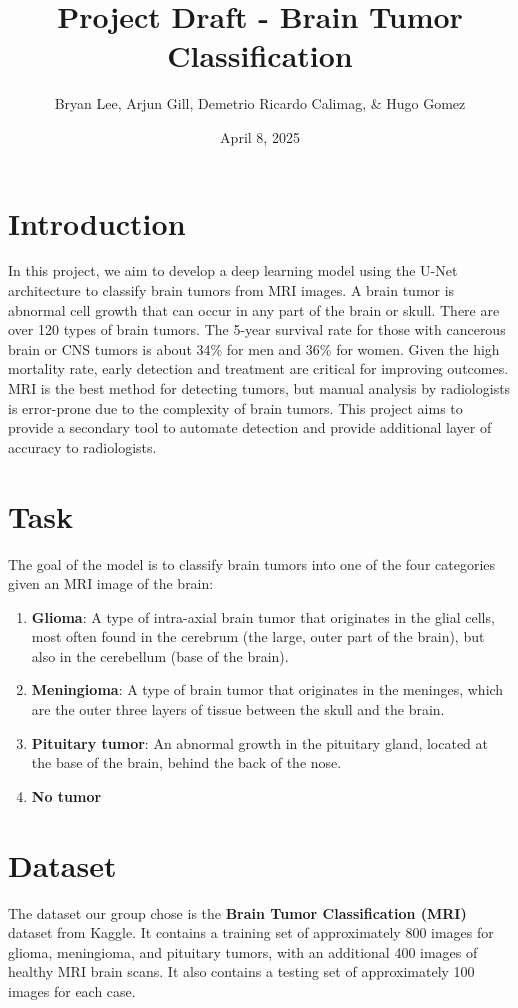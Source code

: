 \documentclass[11pt]{article}
\title{Project Draft - Brain Tumor Classification}
\author{Bryan Lee, Arjun Gill, Demetrio Ricardo Calimag, \& Hugo Gomez}
\date{April 8, 2025}
\begin{document}
\maketitle
\thispagestyle{fancy}

\section{Introduction}
In this project, we aim to develop a deep learning model using the U-Net architecture to classify 
brain tumors from MRI images. A brain tumor is abnormal cell growth that can occur in any 
part of the brain or skull. There are over 120 types of brain tumors. The 5-year survival 
rate for those with cancerous brain or CNS tumors is about 34\% for men and 36\% for women. 
Given the high mortality rate, early detection and treatment are critical for improving outcomes.  
MRI is the best method for detecting tumors, but manual analysis by radiologists is error-prone due to 
the complexity of brain tumors. This project aims to provide a secondary tool to automate detection
and provide additional layer of accuracy to radiologists.

\section{Task}
The goal of the model is to classify brain tumors into one of the four categories given an MRI image of the brain:
\begin{enumerate}
    \item \textbf{Glioma}: A type of intra-axial brain tumor that originates in the glial cells, most often found in the cerebrum 
    (the large, outer part of the brain), but also in the cerebellum (base of the brain).
    \item \textbf{Meningioma}: A type of brain tumor that originates in the meninges, 
    which are the outer three layers of tissue between the skull and the brain. 
    \item \textbf{Pituitary tumor}: An abnormal growth in the pituitary gland, located at the base of the brain, 
    behind the back of the nose.
    \item \textbf{No tumor}
\end{enumerate}

\section{Dataset}
The dataset our group chose is the \textbf{Brain Tumor Classification (MRI)} dataset from Kaggle.
It contains a training set of approximately 800 images for glioma, meningioma, and pituitary tumors, with an additional 400 images of healthy MRI brain scans.
It also contains a testing set of approximately 100 images for each case. \\
\end{document}
